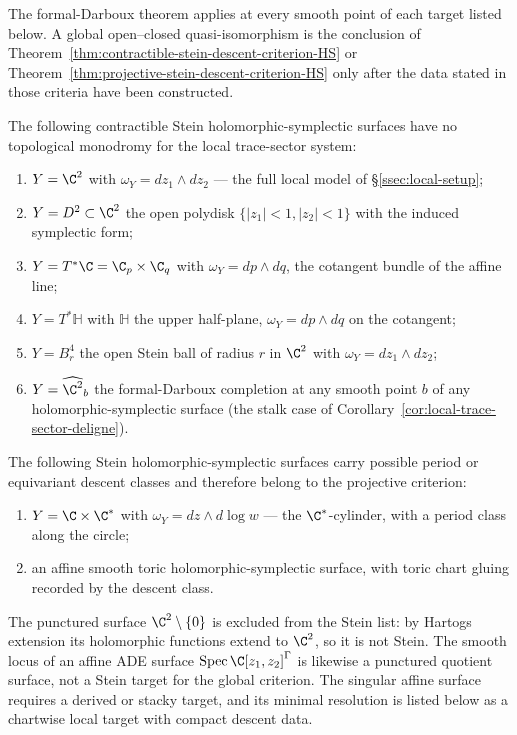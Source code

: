 \begin{cor}
\label{cor:concrete-global-realizations}
The formal-Darboux theorem applies at every smooth point of each
target listed below.  A global open--closed quasi-isomorphism is the conclusion of
Theorem~\ref{thm:contractible-stein-descent-criterion-HS} or
Theorem~\ref{thm:projective-stein-descent-criterion-HS} only after the
data stated in those criteria have been constructed.

The following contractible Stein holomorphic-symplectic surfaces have
no topological monodromy for the local trace-sector system:
\begin{enumerate}[label=\textup{(\arabic*)}]
  \item \(Y=\C^2\) with \(\omega_Y=dz_1\wedge dz_2\) --- the full
        local model of \S\ref{ssec:local-setup};
  \item \(Y=D^2\subset\C^2\) the open polydisk
        \(\{|z_1|<1,|z_2|<1\}\) with the induced symplectic form;
  \item \(Y=T^*\C=\C_p\times\C_q\) with \(\omega_Y=dp\wedge dq\),
        the cotangent bundle of the affine line;
  \item \(Y=T^*\mathbb H\) with \(\mathbb H\) the upper half-plane,
        \(\omega_Y=dp\wedge dq\) on the cotangent;
  \item \(Y=B_r^4\) the open Stein ball of radius \(r\) in \(\C^2\)
        with \(\omega_Y=dz_1\wedge dz_2\);
  \item \(Y=\widehat{\C^2}_{b}\) the formal-Darboux completion at any
        smooth point \(b\) of any holomorphic-symplectic surface
        (the stalk case of Corollary~\ref{cor:local-trace-sector-deligne}).
\end{enumerate}

The following Stein holomorphic-symplectic surfaces carry possible
period or equivariant descent classes and therefore belong to the
projective criterion:
\begin{enumerate}[label=\textup{(\arabic*)},resume]
  \item \(Y=\C\times\C^*\) with \(\omega_Y=dz\wedge d\log w\) --- the
        \(\C^*\)-cylinder, with a period class along the circle;
  \item an affine smooth toric holomorphic-symplectic surface, with
        toric chart gluing recorded by the descent class.
\end{enumerate}

The punctured surface \(\C^2\setminus\{0\}\) is excluded from the
Stein list: by Hartogs extension its holomorphic functions extend to
\(\C^2\), so it is not Stein.
The smooth locus of an affine ADE surface
\(\mathrm{Spec}\,\C[z_1,z_2]^\Gamma\) is likewise a punctured quotient
surface, not a Stein target for the global criterion.  The singular
affine surface requires a derived or stacky target, and its minimal
resolution is listed below as a chartwise local target with compact
descent data.


\end{cor}

